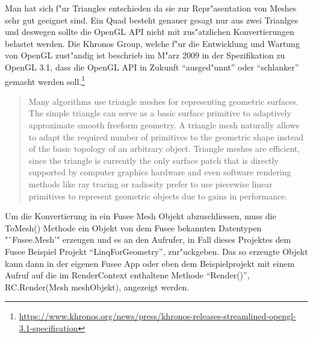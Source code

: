 \documentclass[pagesize, paper=a4, fontsize=12pt,titlepage=true, headings=small, headnosepline, abstractoff, liststotoc, nochapterprefix, plainheadsepline]{scrreprt}
\newcommand{\LFG}{LINQ For Geometry}
\begin{document}
Man hat sich f"ur Triangles entschieden da sie zur Repr"asentation von Meshes sehr gut geeignet sind. Ein Quad besteht genauer gesagt nur aus zwei Trianlges und deswegen sollte die OpenGL API nicht mit zus"atzlichen Konvertierungen belastet werden. Die Khronos Group, welche f"ur die Entwicklung und Wartung von OpenGL zust"andig ist beschrieb im M"arz 2009 in der Spezifikation zu OpenGL 3.1, dass die OpenGL API in Zukunft "`ausged"unnt"' oder "`schlanker"' gemacht werden soll.\footnote{\url{https://www.khronos.org/news/press/khronos-releases-streamlined-opengl-3.1-specification}}

\begin{quote}Many algorithms use triangle meshes for representing geometric surfaces. The simple triangle can serve as a basic surface primitive to adaptively approximate smooth freeform geometry. A triangle mesh naturally allows to adapt the required number of primitives to the geometric shape instead of the basic topology of an arbitrary object. Triangle meshes are efficient, since the triangle is currently the only surface patch that is directly supported by computer graphics hardware and even software rendering methods like ray tracing or radiosity prefer to use piecewise linear primitives to represent geometric objects due to gains in performance. \cite[S.~1]{Campagna.1998}\end{quote}

Um die Konvertierung in ein Fusee Mesh Objekt abzuschliessen, muss die ToMesh() Methode ein Objekt von dem Fusee bekannten Datentypen "`Fusee.Mesh'" erzeugen und es an den Aufrufer, in Fall dieses Projektes dem Fusee Beispiel Projekt "`LinqForGeometry"', zur"uckgeben. Das so erzeugte Objekt kann dann in der eigenen Fusee App oder eben dem Beispielprojekt mit einem Aufruf auf die im RenderContext enthaltene Methode "`Render()"', RC.Render(Mesh meshObjekt), angezeigt werden.

\end{document}
